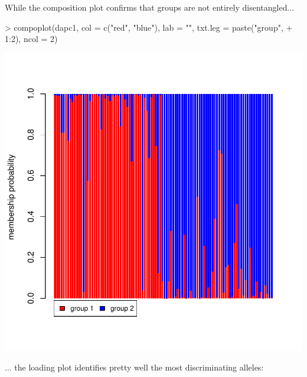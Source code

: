 \documentclass{article}
\begin{document}
\noindent While the composition plot confirms that groups are not entirely disentangled...
\begin{Schunk}
\begin{Sinput}
> compoplot(dapc1, col = c("red", "blue"), lab = "", txt.leg = paste("group", 
+     1:2), ncol = 2)
\end{Sinput}
\end{Schunk}
\includegraphics{figs/genomics-059}

\noindent ... the loading plot identifies pretty well the most discriminating alleles:
\begin{Schunk}
\end{Schunk}
\end{document}
